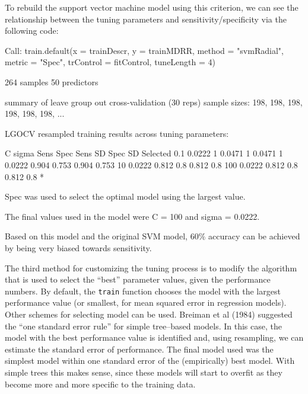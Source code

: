 \documentclass[12pt]{article}
\begin{document}
To rebuild the support vector machine model using this criterion, we can see the relationship between the tuning parameters and sensitivity/specificity via the following code:
\begin{Schunk}
\begin{Soutput}
Call:
train.default(x = trainDescr, y = trainMDRR, method = "svmRadial", 
    metric = "Spec", trControl = fitControl, tuneLength = 4)

264 samples
50 predictors

summary of leave group out cross-validation (30 reps) sample sizes:
    198, 198, 198, 198, 198, 198, ... 

LGOCV resampled training results across tuning parameters:

  C    sigma   Sens   Spec    Sens SD  Spec SD  Selected
  0.1  0.0222  1      0.0471  1        0.0471           
  1    0.0222  0.904  0.753   0.904    0.753            
  10   0.0222  0.812  0.8     0.812    0.8              
  100  0.0222  0.812  0.8     0.812    0.8      *       

Spec was used to select the optimal model using the largest value.

The final values used in the model were C = 100 and sigma = 0.0222.
\end{Soutput}
\end{Schunk}
Based on this model and the original SVM model, 60$\%$ accuracy can be achieved  by being very biased towards sensitivity.

The third method for customizing the tuning process is to modify the algorithm that is used to select the ``best'' parameter values, given the performance numbers. By default, the \texttt{train} function chooses the model with the largest performance value (or smallest, for mean squared error in regression models). Other schemes for selecting model can be used.  Breiman et al (1984) suggested the ``one standard error rule'' for simple tree--based models. In this case, the model with the best performance value is identified and, using resampling, we can estimate the standard error of performance. The final model used was the simplest model within one standard error of the (empirically) best model. With simple trees this makes sense, since these models will start to overfit as they become more and more specific to the training data.
\end{document}
